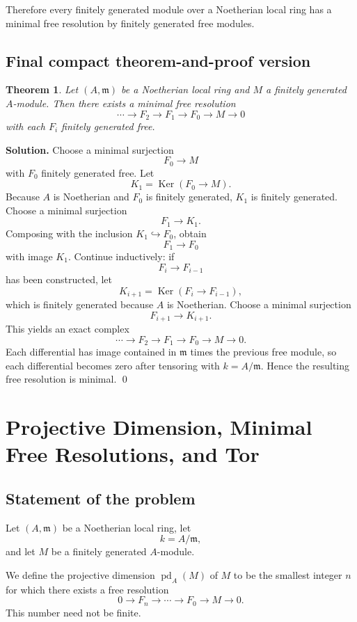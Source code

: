 \documentclass[12pt,a4paper]{article}
\theoremstyle{notespace}
\DeclareMathOperator{\Ker}{Ker}
\newtheorem{theorem}[definition]{Theorem}
\newcommand{\m}{\mathfrak m}
\begin{document}
Therefore every finitely generated module over a Noetherian local ring has a minimal free resolution by finitely generated free modules.

\subsection{Final compact theorem-and-proof version}

\begin{theorem}
	Let \((A,\m)\) be a Noetherian local ring and \(M\) a finitely generated \(A\)-module. Then there exists a minimal free resolution
	\[
	\cdots \longrightarrow F_2 \longrightarrow F_1 \longrightarrow F_0 \longrightarrow M \longrightarrow 0
	\]
	with each \(F_i\) finitely generated free.
\end{theorem}

\textbf{Solution.}
Choose a minimal surjection
\[
F_0\to M
\]
with \(F_0\) finitely generated free. Let
\[
K_1=\Ker(F_0\to M).
\]
Because \(A\) is Noetherian and \(F_0\) is finitely generated, \(K_1\) is finitely generated. Choose a minimal surjection
\[
F_1\to K_1.
\]
Composing with the inclusion \(K_1\hookrightarrow F_0\), obtain
\[
F_1\to F_0
\]
with image \(K_1\). Continue inductively: if
\[
F_i\to F_{i-1}
\]
has been constructed, let
\[
K_{i+1}=\Ker(F_i\to F_{i-1}),
\]
which is finitely generated because \(A\) is Noetherian. Choose a minimal surjection
\[
F_{i+1}\to K_{i+1}.
\]
This yields an exact complex
\[
\cdots \to F_2\to F_1\to F_0\to M\to 0.
\]
Each differential has image contained in \(\m\) times the previous free module, so each differential becomes zero after tensoring with \(k=A/\m\). Hence the resulting free resolution is minimal. \qed


\section{Projective Dimension, Minimal Free Resolutions, and Tor}

\subsection{Statement of the problem}

Let \((A,\mathfrak m)\) be a Noetherian local ring, let
\[
k=A/\mathfrak m,
\]
and let \(M\) be a finitely generated \(A\)-module.

We define the projective dimension \(\operatorname{pd}_A(M)\) of \(M\) to be the smallest integer \(n\) for which there exists a free resolution
\[
0 \longrightarrow F_n \longrightarrow \cdots \longrightarrow F_0 \longrightarrow M \longrightarrow 0.
\]
This number need not be finite.
\end{document}
